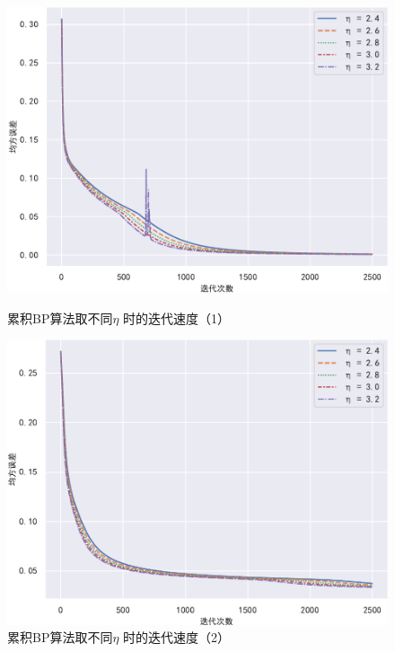 \documentclass{ctexart}
\begin{document}
	\begin{figure}[!htb]
		\centering
		\begin{minipage}{0.49\linewidth}
			\centering
			\includegraphics[width=\textwidth]{../image/累积BP抖动1.pdf}
			\caption{累积BP算法取不同$\eta$ 时的迭代速度（1）}
			\label{累积1}%
		\end{minipage}
		\begin{minipage}{0.49\linewidth}
			\centering
			\includegraphics[width=\textwidth]{../image/累积BP抖动2.pdf}
			\caption{累积BP算法取不同$\eta$ 时的迭代速度（2）}
			\label{累积2}%
		\end{minipage}
		

\end{figure}
\end{document}
